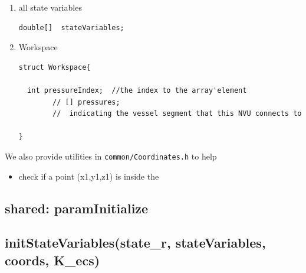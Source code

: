 \begin{enumerate}
  \item all state variables
  
\begin{verbatim}
double[]  stateVariables;
\end{verbatim}
  
  \item Workspace 
  
  
\begin{verbatim}
struct Workspace{

  int pressureIndex;  //the index to the array'element
        // [] pressures;
        //  indicating the vessel segment that this NVU connects to
        
}
\end{verbatim}
\end{enumerate}


We also provide utilities in \verb!common/Coordinates.h! to help
\begin{itemize}
  \item check if a point (x1,y1,z1) is inside the 
\end{itemize}

\subsection{shared: paramInitialize}

\subsection{initStateVariables(state\_r, stateVariables, coords, K\_ecs)}
\label{sec:initStateVariables-NVUNode}

